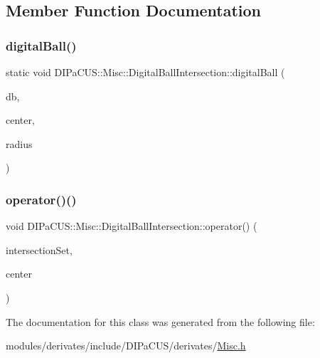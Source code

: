 \subsection{Member Function Documentation}
\mbox{\label{classDIPaCUS_1_1Misc_1_1DigitalBallIntersection_afa60d40e425368adaf396d7a1a71242f}} 
\subsubsection{\texorpdfstring{digital\+Ball()}{digitalBall()}}
{\footnotesize\ttfamily static void D\+I\+Pa\+C\+U\+S\+::\+Misc\+::\+Digital\+Ball\+Intersection\+::digital\+Ball (\begin{DoxyParamCaption}\item[{\hyperlink{classDIPaCUS_1_1Misc_1_1DigitalBallIntersection_aaed19d165964a423d69f19a3de0d5587}{Digital\+Set} \&}]{db,  }\item[{\hyperlink{classDIPaCUS_1_1Misc_1_1DigitalBallIntersection_a7e348073cb818df2e225d22746e1d6af}{Point}}]{center,  }\item[{int}]{radius }\end{DoxyParamCaption})\hspace{0.3cm}{\ttfamily [static]}}

\mbox{\label{classDIPaCUS_1_1Misc_1_1DigitalBallIntersection_aa7e9ee375a80f5746cfc066666b0615d}} 
\subsubsection{\texorpdfstring{operator()()}{operator()()}}
{\footnotesize\ttfamily void D\+I\+Pa\+C\+U\+S\+::\+Misc\+::\+Digital\+Ball\+Intersection\+::operator() (\begin{DoxyParamCaption}\item[{\hyperlink{classDIPaCUS_1_1Misc_1_1DigitalBallIntersection_aaed19d165964a423d69f19a3de0d5587}{Digital\+Set} \&}]{intersection\+Set,  }\item[{\hyperlink{classDIPaCUS_1_1Misc_1_1DigitalBallIntersection_a7e348073cb818df2e225d22746e1d6af}{Point}}]{center }\end{DoxyParamCaption})}



The documentation for this class was generated from the following file\+:\begin{DoxyCompactItemize}
\item 
modules/derivates/include/\+D\+I\+Pa\+C\+U\+S/derivates/\hyperlink{Misc_8h}{Misc.\+h}\end{DoxyCompactItemize}
